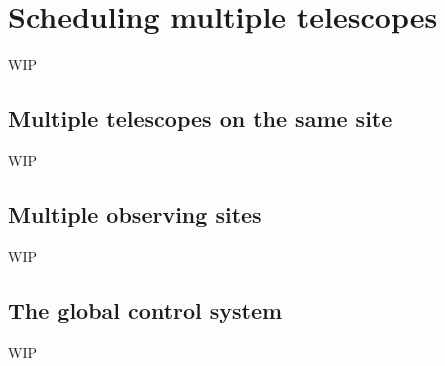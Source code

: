 \section{Scheduling multiple telescopes}
\label{sec:multiscope}
\begin{colsection}


\begin{colsection}

WIP

\end{colsection}


\subsection{Multiple telescopes on the same site}
\label{sec:onesite}
\begin{colsection}

WIP

\end{colsection}


\subsection{Multiple observing sites}
\label{sec:multisite}
\begin{colsection}

WIP

\end{colsection}


\subsection{The global control system}
\label{sec:global}
\begin{colsection}

WIP

\end{colsection}


\end{colsection}

